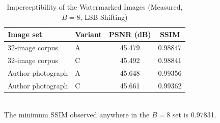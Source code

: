 \begin{table}[t]
\caption{Imperceptibility of the Watermarked Images (Measured, $B=8$, LSB Shifting)}
\label{tab:imperc}
\centering
\begin{tabular}{llcc}
\toprule
Image set & Variant & PSNR (dB) & SSIM \\
\midrule
32-image corpus      & A & 45.479 & 0.98847 \\
32-image corpus      & C & 45.492 & 0.98841 \\
Author photograph    & A & 45.648 & 0.99356 \\
Author photograph    & C & 45.661 & 0.99362 \\
\bottomrule
\end{tabular}
\\[2pt]
\footnotesize The minimum SSIM observed anywhere in the $B=8$ set is 0.97831.
\end{table}

